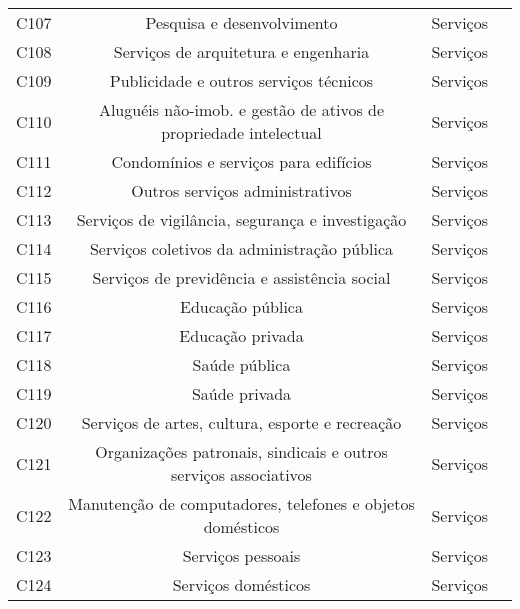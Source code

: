 \begin{apendicesenv}
\begin{small}
\begin{center}
\begin{longtable}{lccc}
				C107 & Pesquisa e desenvolvimento & Serviços \\
				C108 & Serviços de arquitetura e engenharia & Serviços \\
				C109 & Publicidade e outros serviços técnicos & Serviços \\
				C110 & Aluguéis não-imob. e gestão de ativos de propriedade intelectual & Serviços \\
				C111 & Condomínios e serviços para edifícios & Serviços \\
				C112 & Outros serviços administrativos & Serviços \\
				C113 & Serviços de vigilância, segurança e investigação & Serviços \\
				C114 & Serviços coletivos da administração pública & Serviços \\
				C115 & Serviços de previdência e assistência social & Serviços \\
				C116 & Educação pública & Serviços \\
				C117 & Educação privada & Serviços \\
				C118 & Saúde pública & Serviços \\
				C119 & Saúde privada & Serviços \\
				C120 & Serviços de artes, cultura, esporte e recreação & Serviços \\
				C121 & Organizações patronais, sindicais e outros serviços associativos & Serviços \\
				C122 & Manutenção de computadores, telefones e objetos domésticos & Serviços \\
				C123 & Serviços pessoais & Serviços \\
				C124 & Serviços domésticos & Serviços \\ \hline
			\end{longtable}
		\end{center}
	\end{small}
	


\end{apendicesenv}


